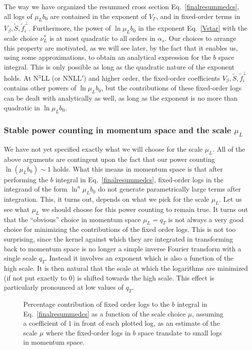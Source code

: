 \documentclass[a4,letterpaper,11pt]{article}
\newcommand{\as}{\alpha_s}
\newcommand{\wt}{\widetilde}
\newcommand{\eq}[1]{Eq.~\eqref{#1}}
\begin{document}
 The way we have organized the resummed cross section \eq{finalresummedcs}, all logs of $\mu_L b_0$ are contained in the exponent of $V_\Gamma$, and in fixed-order terms in $V_\beta,\wt S,\wt f_i^\perp$. Furthermore, the power of $\ln\mu_L b_0$ in the exponent \eq{Vstar} with the scale choice $\nu_L^*$ is at most quadratic to all orders in $\as$.  
Our choices to arrange this property are motivated, as we will see later, by the fact that it enables us, using some approximations, to obtain an analytical expression for the $b$ space integral. This is only possible as long as the quadratic nature of the exponent holds. 
At N$^3$LL (or NNLL$'$) and higher order, the fixed-order coefficients $V_\beta,\wt S,\wt f_i^\perp$ contains other powers of $\ln\mu_Lb_0$, but the contributions of these fixed-order logs can be dealt with analytically as well, as long as the exponent is no more than quadratic in $\ln\mu_L b_0$.


\subsubsection{Stable power counting in momentum space and the scale $\mu_L$}
\label{ssec:muLscale}


We have not yet specified exactly what we will choose for the scale $\mu_L$.  All of the above arguments are contingent upon the fact that our power counting $\ln(\mu_L b_0) \sim 1$ holds. What this means in momentum space is that after performing the $b$ integral in \eq{finalresummedcs}, fixed-order logs in the integrand of the form $\ln^n \mu_L b_0$ do not generate parametrically large terms after integration. This, it turns out, depends on what we pick for the scale $\mu_L$.  Let us see what $\mu_L$ we should choose for this power counting to remain true. It turns out that the ``obvious'' choice in momentum space $\mu_L =q_T$ is not always a very good choice for minimizing the contributions of the fixed order logs. This is not too surprising, since the kernel against which they are integrated in transforming back to momentum space is no longer a simple inverse Fourier transform with a single scale $q_T$. Instead it involves an exponent which is also a function of the high scale. It is then natural that the scale at which the logarithms are minimized (if not put exactly to 0) is shifted towards the high scale. This effect is particularly pronounced at low values of $q_T$. 


\begin{figure}
\centerline{}
\vskip-0.5cm
\caption[1]{Percentage contribution of fixed order logs to the $b$ integral in \eq{finalresummedcs} as a function of the scale choice $\mu$, assuming a coefficient of $1$ in front of each plotted log, as an estimate of the scale $\mu$ where the fixed-order logs in $b$ space translate to small logs in momentum space.}
\label{fig:fixed} 
\end{figure}
\end{document}
